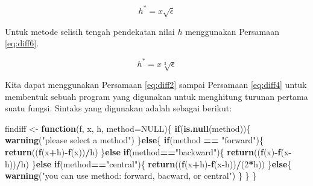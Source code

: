 \documentclass[
]{book}
\newenvironment{Shaded}{\begin{snugshade}}{\end{snugshade}}
\newcommand{\AttributeTok}[1]{\textcolor[rgb]{0.13,0.29,0.53}{#1}}
\newcommand{\ConstantTok}[1]{\textcolor[rgb]{0.56,0.35,0.01}{#1}}
\newcommand{\ControlFlowTok}[1]{\textcolor[rgb]{0.13,0.29,0.53}{\textbf{#1}}}
\newcommand{\DecValTok}[1]{\textcolor[rgb]{0.00,0.00,0.81}{#1}}
\newcommand{\FunctionTok}[1]{\textcolor[rgb]{0.13,0.29,0.53}{\textbf{#1}}}
\newcommand{\NormalTok}[1]{#1}
\newcommand{\OtherTok}[1]{\textcolor[rgb]{0.56,0.35,0.01}{#1}}
\newcommand{\SpecialCharTok}[1]{\textcolor[rgb]{0.81,0.36,0.00}{\textbf{#1}}}
\newcommand{\StringTok}[1]{\textcolor[rgb]{0.31,0.60,0.02}{#1}}
\theoremstyle{definition}
\theoremstyle{definition}
\theoremstyle{definition}
\theoremstyle{definition}
\theoremstyle{remark}
\begin{document}
\begin{equation}
h^{\ast}=x\sqrt{\epsilon}
  \label{eq:diff5}
\end{equation}

Untuk metode selisih tengah pendekatan nilai \(h\) menggunakan Persamaan \eqref{eq:diff6}.

\begin{equation}
h^{\ast}=x\sqrt[3]{\epsilon}
  \label{eq:diff6}
\end{equation}

Kita dapat menggunakan Persamaan \eqref{eq:diff2} sampai Persamaan \eqref{eq:diff4} untuk membentuk sebuah program yang digunakan untuk menghitung turunan pertama suatu fungsi. Sintaks yang digunakan adalah sebagai berikut:

\begin{Shaded}
\begin{Highlighting}[]
\NormalTok{findiff }\OtherTok{\textless{}{-}} \ControlFlowTok{function}\NormalTok{(f, x, h, }\AttributeTok{method=}\ConstantTok{NULL}\NormalTok{)\{}
  \ControlFlowTok{if}\NormalTok{(}\FunctionTok{is.null}\NormalTok{(method))\{}
    \FunctionTok{warning}\NormalTok{(}\StringTok{"please select a method"}\NormalTok{)}
\NormalTok{  \}}\ControlFlowTok{else}\NormalTok{\{}
    \ControlFlowTok{if}\NormalTok{(method }\SpecialCharTok{==} \StringTok{"forward"}\NormalTok{)\{}
      \FunctionTok{return}\NormalTok{((}\FunctionTok{f}\NormalTok{(x}\SpecialCharTok{+}\NormalTok{h)}\SpecialCharTok{{-}}\FunctionTok{f}\NormalTok{(x))}\SpecialCharTok{/}\NormalTok{h)}
\NormalTok{    \}}\ControlFlowTok{else} \ControlFlowTok{if}\NormalTok{(method}\SpecialCharTok{==}\StringTok{"backward"}\NormalTok{)\{}
      \FunctionTok{return}\NormalTok{((}\FunctionTok{f}\NormalTok{(x)}\SpecialCharTok{{-}}\FunctionTok{f}\NormalTok{(x}\SpecialCharTok{{-}}\NormalTok{h))}\SpecialCharTok{/}\NormalTok{h)}
\NormalTok{    \}}\ControlFlowTok{else} \ControlFlowTok{if}\NormalTok{(method}\SpecialCharTok{==}\StringTok{"central"}\NormalTok{)\{}
      \FunctionTok{return}\NormalTok{((}\FunctionTok{f}\NormalTok{(x}\SpecialCharTok{+}\NormalTok{h)}\SpecialCharTok{{-}}\FunctionTok{f}\NormalTok{(x}\SpecialCharTok{{-}}\NormalTok{h))}\SpecialCharTok{/}\NormalTok{(}\DecValTok{2}\SpecialCharTok{*}\NormalTok{h))}
\NormalTok{    \}}\ControlFlowTok{else}\NormalTok{\{}
      \FunctionTok{warning}\NormalTok{(}\StringTok{"you can use method: forward, bacward, or central"}\NormalTok{)}
\NormalTok{    \}}
\NormalTok{  \}}
\NormalTok{\}}
\end{Highlighting}
\end{Shaded}
\end{document}
